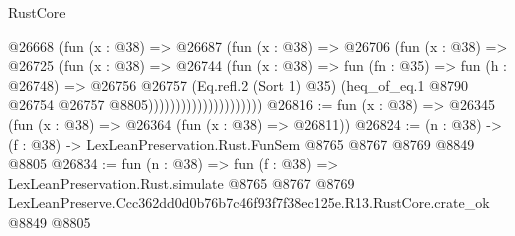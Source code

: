 \begin{lexlean}{RustCore}
\begin{coremodule}
                                @26668
                                  (fun (x : @38) =>
                                  @26687
                                    (fun (x : @38) =>
                                    @26706
                                      (fun (x : @38) =>
                                      @26725
                                        (fun (x : @38) =>
                                        @26744
                                          (fun (x : @38) =>
                                          fun (fn : @35) =>
                                          fun (h : @26748) =>
                                          @26756
                                            @26757
                                            (Eq.refl.{2} (Sort 1) @35)
                                            (heq_of_eq.{1}
                                              @8790
                                              @26754
                                              @26757
                                              @8805)))))))))))))))))))))
@26816 := fun (x : @38) => @26345 (fun (x : @38) => @26364 (fun (x : @38) => @26811))
@26824 := (n : @38) -> (f : @38) -> LexLeanPreservation.Rust.FunSem @8765 @8767 @8769 @8849 @8805
@26834 := fun (n : @38) =>
  fun (f : @38) =>
  LexLeanPreservation.Rust.simulate
    @8765
    @8767
    @8769
    LexLeanPreserve.Ccc362dd0d0b76b7c46f93f7f38ec125e.R13.RustCore.crate_ok
    @8849
    @8805
\end{coremodule}
\end{lexlean}
